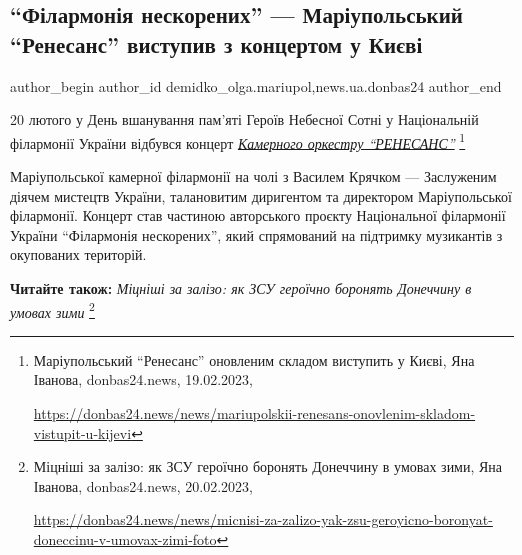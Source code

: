  
 
 
 
 
 
\subsection{\enquote{Філармонія нескорених} — Маріупольський \enquote{Ренесанс} виступив з концертом у Києві}
\label{sec:21_02_2023.stz.news.ua.donbas24.1.filarmonia_neskorenyh_mrpl_renesans_koncert_kyiv}
 
\ifcmt
 author_begin
   author_id demidko_olga.mariupol,news.ua.donbas24
 author_end
\fi

20 лютого у День вшанування пам'яті Героїв Небесної Сотні у Національній
філармонії України відбувся концерт \href{https://donbas24.news/news/mariupolskii-renesans-onovlenim-skladom-vistupit-u-kijevi}{\emph{Камерного оркестру \enquote{РЕНЕСАНС}}}%
\footnote{Маріупольський \enquote{Ренесанс} оновленим складом виступить у Києві, Яна Іванова, donbas24.news, 19.02.2023, \par\url{https://donbas24.news/news/mariupolskii-renesans-onovlenim-skladom-vistupit-u-kijevi}}

Маріупольської камерної філармонії на чолі з Василем Крячком — Заслуженим
діячем мистецтв України, талановитим диригентом та директором Маріупольської
філармонії. Концерт став частиною авторського проєкту Національної філармонії
України \enquote{Філармонія нескорених}, який спрямований на підтримку музикантів з
окупованих територій.

\textbf{Читайте також:} \emph{Міцніші за залізо: як ЗСУ героїчно боронять Донеччину в умовах зими}%
\footnote{Міцніші за залізо: як ЗСУ героїчно боронять Донеччину в умовах зими, Яна Іванова, donbas24.news, 20.02.2023, \par%
\url{https://donbas24.news/news/micnisi-za-zalizo-yak-zsu-geroyicno-boronyat-doneccinu-v-umovax-zimi-foto}%
}

